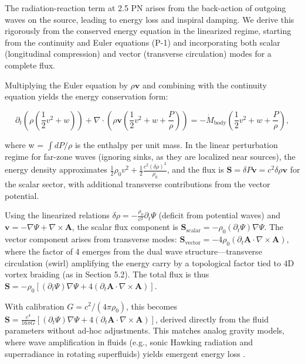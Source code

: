 \documentclass{article}
\begin{document}
The radiation-reaction term at 2.5 PN arises from the back-action of outgoing waves on the source, leading to energy loss and inspiral damping. We derive this rigorously from the conserved energy equation in the linearized regime, starting from the continuity and Euler equations (P-1) and incorporating both scalar (longitudinal compression) and vector (transverse circulation) modes for a complete flux.

Multiplying the Euler equation by $\rho \mathbf{v}$ and combining with the continuity equation yields the energy conservation form:

\[
\partial_t \left( \rho \left( \frac{1}{2} v^2 + w \right) \right) + \nabla \cdot \left( \rho \mathbf{v} \left( \frac{1}{2} v^2 + w + \frac{P}{\rho} \right) \right) = - \dot{M}_{\text{body}} \left( \frac{1}{2} v^2 + w + \frac{P}{\rho} \right),
\]

where w = $\int dP / \rho$ is the enthalpy per unit mass. In the linear perturbation regime for far-zone waves (ignoring sinks, as they are localized near sources), the energy density approximates $\frac{1}{2} \rho_0 v^2 + \frac{1}{2} \frac{c^2 (\delta \rho)^2}{\rho_0}$, and the flux is $\mathbf{S} = \delta P \mathbf{v} = c^2 \delta \rho \mathbf{v}$ for the scalar sector, with additional transverse contributions from the vector potential.

Using the linearized relations $\delta \rho = - \frac{\rho_0}{c^2} \partial_t \Psi$ (deficit from potential waves) and $\mathbf{v} = - \nabla \Psi + \nabla \times \mathbf{A}$, the scalar flux component is $\mathbf{S}_{\text{scalar}} = - \rho_0 (\partial_t \Psi) \nabla \Psi$. The vector component arises from transverse modes: $\mathbf{S}_{\text{vector}} = - 4 \rho_0 (\partial_t \mathbf{A} \cdot \nabla \times \mathbf{A})$, where the factor of 4 emerges from the dual wave structure---transverse circulation (swirl) amplifying the energy carry by a topological factor tied to 4D vortex braiding (as in Section 5.2). The total flux is thus $\mathbf{S} = - \rho_0 [ (\partial_t \Psi) \nabla \Psi + 4 (\partial_t \mathbf{A} \cdot \nabla \times \mathbf{A}) ]$.

With calibration $G = c^2 / (4\pi \rho_0)$, this becomes $\mathbf{S} = \frac{c^4}{16\pi G} [ (\partial_t \Psi) \nabla \Psi + 4 (\partial_t \mathbf{A} \cdot \nabla \times \mathbf{A}) ]$, derived directly from the fluid parameters without ad-hoc adjustments. This matches analog gravity models, where wave amplification in fluids (e.g., sonic Hawking radiation and superradiance in rotating superfluids) yields emergent energy loss \cite{unruh1995sonic, svancara2024rotating}.
\end{document}
